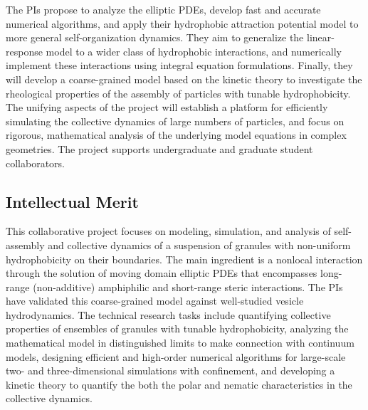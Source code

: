 \documentclass[10pt]{article}
\begin{document}
The PIs propose to analyze the elliptic PDEs, develop fast and accurate
numerical algorithms, and apply their hydrophobic attraction potential
model to more general self-organization dynamics. They aim to generalize
the linear-response model to a wider class of hydrophobic interactions,
and numerically implement these interactions using integral equation
formulations. Finally, they will develop a coarse-grained model based on
the kinetic theory to investigate the rheological properties of the
assembly of particles with tunable hydrophobicity. The unifying aspects
of the project will establish a platform for efficiently simulating
the collective dynamics of large numbers of particles, and focus on
rigorous, mathematical analysis of the underlying model equations in
complex geometries. The project supports undergraduate and graduate
student collaborators.

\subsection*{Intellectual Merit}
\vspace{-0.1in}
This collaborative project focuses on modeling, simulation, and analysis
of self-assembly and collective dynamics of a suspension of granules with 
non-uniform hydrophobicity on their boundaries. The main
ingredient is a nonlocal interaction through the solution of moving
domain elliptic PDEs that encompasses long-range (non-additive) amphiphilic and
short-range steric interactions. The PIs have validated this
coarse-grained model against well-studied vesicle hydrodynamics. The
technical research tasks include quantifying collective properties of
ensembles of granules with tunable hydrophobicity, analyzing the mathematical model in 
distinguished limits to make connection with continuum models,
designing efficient and
high-order numerical algorithms for large-scale two- and
three-dimensional simulations with confinement, and developing a kinetic
theory to quantify the both the polar and nematic characteristics in the collective dynamics.

\end{document}
